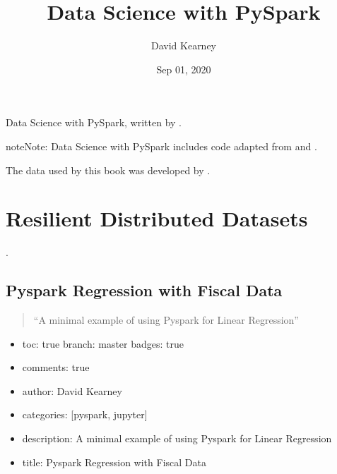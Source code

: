 \documentclass[letterpaper,10pt,english]{sphinxmanual}
\title{Data Science with PySpark}
\date{Sep 01, 2020}
\author{David Kearney}
\begin{document}
\pagestyle{empty}
\sphinxmaketitle
\pagestyle{plain}
\sphinxtableofcontents
\pagestyle{normal}
\label{\detokenize{intro::doc}}


Data Science with PySpark, written by .

\begin{sphinxadmonition}{note}{Note:}
Data Science with PySpark includes code adapted from  and .
\end{sphinxadmonition}

The data used by this book was developed by .


\chapter{Resilient Distributed Datasets}
\label{\detokenize{intro:resilient-distributed-datasets}}
.




\section{Pyspark Regression with Fiscal Data}
\label{\detokenize{2020-08-15-Pyspark-Fiscal-Data-Regression:pyspark-regression-with-fiscal-data}}\label{\detokenize{2020-08-15-Pyspark-Fiscal-Data-Regression::doc}}\begin{quote}

“A minimal example of using Pyspark for Linear Regression”
\end{quote}
\begin{itemize}
\item {} 
toc: true\sphinxhyphen{} branch: master\sphinxhyphen{} badges: true

\item {} 
comments: true

\item {} 
author: David Kearney

\item {} 
categories: {[}pyspark, jupyter{]}

\item {} 
description: A minimal example of using Pyspark for Linear Regression

\item {} 
title: Pyspark Regression with Fiscal Data

\end{itemize}
\end{document}
